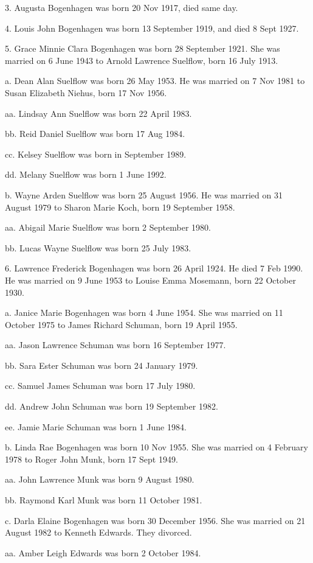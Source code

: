 \documentclass[a4paper]{article}
\begin{document}
3. Augusta Bogenhagen was born 20 Nov 1917, died same day.

4. Louis John Bogenhagen was born 13 September 1919, and died 8 Sept 1927.

5. Grace Minnie Clara Bogenhagen was born 28 September 1921.  She was married on 6 June 1943 to Arnold Lawrence Suelflow, born 16 July 1913.

a. Dean Alan Suelflow was born 26 May 1953.  He was married on 7 Nov 1981 to Susan Elizabeth Niehus, born 17 Nov 1956.

aa. Lindsay Ann Suelflow was born 22 April 1983.

bb. Reid Daniel Suelflow was born 17 Aug 1984.

cc. Kelsey Suelflow was born in September 1989.

dd. Melany Suelflow was born 1 June 1992.

b. Wayne Arden Suelflow was born 25 August 1956.  He was married on 31 August 1979 to Sharon Marie Koch, born 19 September 1958.
 
aa. Abigail Marie Suelflow was born 2 September 1980.

bb. Lucas Wayne Suelflow was born 25 July 1983.

6. Lawrence Frederick Bogenhagen was born 26 April 1924.  He died 7 Feb 1990. He was married on 9 June 1953 to Louise Emma Mosemann, born 22 October 1930.

a. Janice Marie Bogenhagen was born 4 June 1954.  She was married on 11 October 1975 to James Richard Schuman,  born 19 April 1955.

aa. Jason Lawrence Schuman was born 16 September 1977.

bb. Sara Ester Schuman was born 24 January 1979.

cc. Samuel James Schuman was born 17 July 1980.

dd. Andrew John Schuman was born 19 September 1982.

ee. Jamie Marie Schuman was born 1 June 1984. 

b. Linda Rae Bogenhagen was born 10 Nov 1955.  She was married on 4 February 1978 to Roger John Munk, born 17 Sept 1949.

aa. John Lawrence Munk was born 9 August 1980.

bb. Raymond Karl Munk was born 11 October 1981.

c. Darla Elaine Bogenhagen was born 30 December 1956.  She was married on 21 August 1982 to Kenneth Edwards.  They divorced.

aa. Amber Leigh Edwards was born 2 October 1984.
\end{document}
